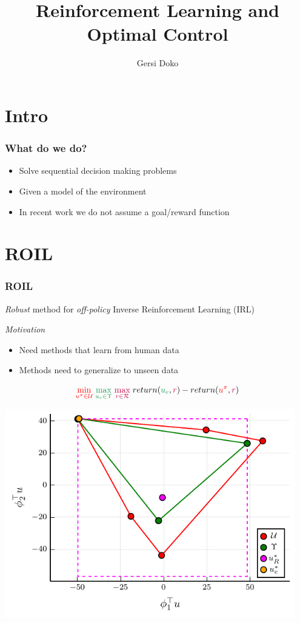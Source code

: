 \documentclass{beamer}
\title{Reinforcement Learning and Optimal Control}
\author{Gersi Doko}
\institute{Department of Computer Science \\ University of New Hampshire}
\date{}
\begin{document}
\frame{\titlepage}

\section*{Intro}

\begin{frame}
\frametitle{What do we do?}
	\begin{itemize}
		\item Solve sequential decision making problems
		\vfill
		\item Given a model of the environment
		\vfill
	        \item In recent work we do not assume a goal/reward function
	\end{itemize}
\end{frame}

\section*{ROIL}

\begin{frame}
	\frametitle{ROIL}
	\emph{Robust} method for \emph{off-policy} Inverse Reinforcement Learning (IRL)

	\vfill
	\emph{Motivation}
	\begin{itemize}
	  \item Need methods that learn from human data
	  \item Methods need to generalize to unseen data
	\end{itemize}
\end{frame}

\begin{frame}
	\[ \textcolor{red}{\min_{u^\pi \in \mathcal{U}}} \; \textcolor{ForestGreen}{\max_{u_e \in \Upsilon}} \; \textcolor{purple}{\max_{r \in \mathcal{R}}} \;return(\textcolor{ForestGreen}{u_e}, \textcolor{purple}{r}) - return(\textcolor{red}{u^\pi}, \textcolor{purple}{r})\]
  \vfill
  \begin{center}
	  \includegraphics[width=0.95\textwidth, height=0.85\textheight]{../../pres_roil/plots/visual_solve_cheb.pdf}
  \end{center}
\end{frame}
\end{document}
